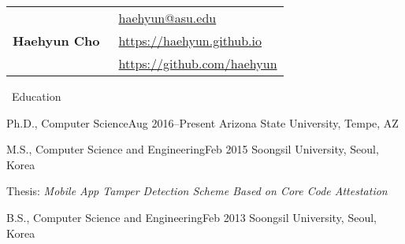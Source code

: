 \documentclass{resume} %
\providecommand*\email[1]{\href{mailto:#1}{#1}}
\begin{document}
\begin{table}[t]
\begin{tabular}{ll}
	\multirow{3}{*}{ \Huge\textbf{Haehyun Cho} } 
	& \hspace{1.7cm}\faEnvelopeSquare~\email{haehyun@asu.edu}\\
	& \hspace{1.7cm}\faExternalLink~\href{https://haehyun.github.io}{https://haehyun.github.io} \\
	& \hspace{1.7cm}\faGithub~\href{https://github.com/haehyun}{https://github.com/haehyun}\\
\end{tabular}
\end{table}

\vspace{-10mm}

\begin{rSection}{\faGenderless~Education}

	\begin{rSubsection2}
		{Ph.D., Computer Science}{Aug 2016--Present}
		{Arizona State University, Tempe, AZ}{}
	\end{rSubsection2}
	\vspace{-3mm}
	\begin{rSubsection}
		{M.S., Computer Science and Engineering}{Feb 2015}
		{Soongsil University, Seoul, Korea}{}
		\item Thesis: \emph{Mobile App Tamper Detection Scheme Based on Core Code Attestation}
		
	\end{rSubsection}
	\vspace{-3mm}
	\begin{rSubsection2}
		{B.S., Computer Science and Engineering}{Feb 2013}
		{Soongsil University, Seoul, Korea}{}
	\end{rSubsection2}

\end{rSection}
\end{document}

